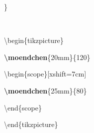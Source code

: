 {{\rule[-0.5ex]{0pt}{2.5ex}\hspace*{0.0em}\}\\
\rule[-0.5ex]{0pt}{2.5ex}\hspace*{0.0em}\\
\rule[-0.5ex]{0pt}{2.5ex}\hspace*{0.0em}\textbackslash{}begin\{tikzpicture\}\\
\rule[-0.5ex]{0pt}{2.5ex}\hspace*{1.0em}\textcolor{R}{\textbf{\textbackslash{}moendchen}}\{20mm\}\{120\}\\
\rule[-0.5ex]{0pt}{2.5ex}\hspace*{1.0em}\textbackslash{}begin\{scope\}[xshift=7cm]\\
\rule[-0.5ex]{0pt}{2.5ex}\hspace*{2.0em}\textcolor{R}{\textbf{\textbackslash{}moendchen}}\{25mm\}\{80\}\\
\rule[-0.5ex]{0pt}{2.5ex}\hspace*{1.0em}\textbackslash{}end\{scope\}\\
\rule[-0.5ex]{0pt}{2.5ex}\hspace*{0.0em}\textbackslash{}end\{tikzpicture\}}%
}%
\endgroup
